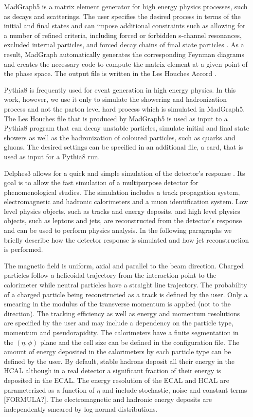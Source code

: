 MadGraph5 is a matrix element generator for high energy physics processes, such as decays and scatterings. The user specifies the desired process in terms of the initial and final states and can impose additional constraints such as allowing for a number of refined criteria, including forced or forbidden s-channel resonances, excluded internal particles, and forced decay chains of final state particles \cite{MG5}. As a result, MadGraph automatically generates the corresponding Feynman diagrams and creates the necessary code to compute the matrix element at a given point of the phase space. The output file is written in the Les Houches Accord \cite{lhe}.

Pythia8 is frequently used for event generation in high energy physics. In this work, however, we use it only to simulate the showering and hadronization process and not the parton level hard process which is simulated in MadGraph5. The Les Houches file that is produced by MadGraph5 is used as input to a Pythia8 program that can decay unstable particles, simulate initial and final state showers as well as the hadronization of coloured particles, such as quarks and gluons. The desired settings can be specified in an additional file, a card, that is used as input for a Pythia8 run.

Delphes3 allows for a quick and simple simulation of the detector's response \cite{Delphes}. Its goal is to allow the fast simulation of a multipurpose detector for phenomenological studies. The simulation includes a track propagation system, electromagnetic and hadronic calorimeters and a muon identification system. Low level physics objects, such as tracks and energy deposits, and high level physics objects, such as leptons and jets, are reconstructed from the detector's response and can be used to perform physics analysis. In the following paragraphs we briefly describe how the detector response is simulated and how jet reconstruction is performed.  

The magnetic field is uniform, axial and parallel to the beam direction. Charged particles follow a helicoidal trajectory from the interaction point to the calorimeter while neutral particles have a straight line trajectory. The probability of a charged particle being reconstructed as a track is defined by the user. Only a smearing in the modulus of the transverse momentum is applied (not to the direction). The tracking efficiency as well as energy and momentum resolutions are specified by the user and may include a dependency on the particle type, momentum and pseudorapidity. The calorimeters have a finite segmentation in the $(\eta,\phi)$ plane and the cell size can be defined in the configuration file. The amount of energy deposited in the calorimeters by each particle type can be defined by the user. By default, stable hadrons deposit all their energy in the HCAL although in a real detector a significant fraction of their energy is deposited in the ECAL. The energy resolution of the ECAL and HCAL are parameterized as a function of $\eta$ and include stochastic, noise and constant terms [FORMULA?]. The electromagnetic and hadronic energy deposits are independently smeared by log-normal distributions. 

